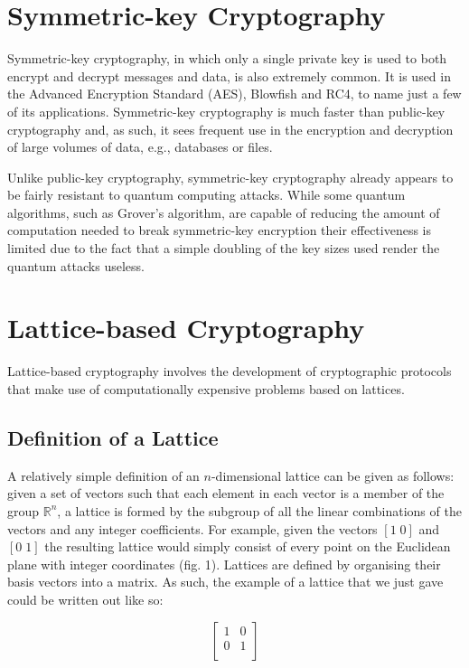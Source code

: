 \documentclass[journal]{IEEEtran}
\begin{document}
\section{Symmetric-key Cryptography}

Symmetric-key cryptography, in which only a single private key is used to both encrypt and decrypt messages and data, is also extremely common. It is used in the Advanced Encryption Standard (AES), Blowfish and RC4, to name just a few of its applications. Symmetric-key cryptography is much faster than public-key cryptography and, as such, it sees frequent use in the encryption and decryption of large volumes of data, e.g., databases or files.

Unlike public-key cryptography, symmetric-key cryptography already appears to be fairly resistant to quantum computing attacks. While some quantum algorithms, such as Grover's algorithm, are capable of reducing the amount of computation needed to break symmetric-key encryption their effectiveness is limited due to the fact that a simple doubling of the key sizes used render the quantum attacks useless.

\section{Lattice-based Cryptography}

Lattice-based cryptography involves the development of cryptographic protocols that make use of computationally expensive problems based on lattices.

\subsection{Definition of a Lattice}

A relatively simple definition of an $n$-dimensional lattice can be given as follows: given a set of vectors such that each element in each vector is a member of the group $\mathbb{R}^n$, a lattice is formed by the subgroup of all the linear combinations of the vectors and any integer coefficients. For example, given the vectors $[1\;0]$ and $[0\;1]$ the resulting lattice would simply consist of every point on the Euclidean plane with integer coordinates (fig. 1). Lattices are defined by organising their basis vectors into a matrix. As such, the example of a lattice that we just gave could be written out like so:

$$\begin{bmatrix} 1 & 0 \\ 0 & 1 \\ \end{bmatrix}$$
\end{document}
